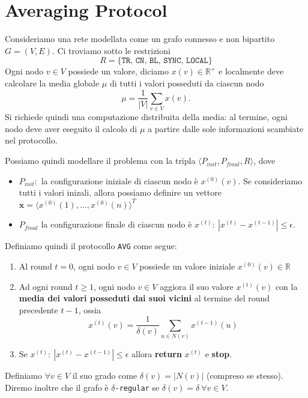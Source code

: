 \chapter{Averaging Protocol}

Consideriamo una rete modellata come un grafo connesso e non bipartito $G = (V, E)$. Ci troviamo sotto le restrizioni 
\[
    R = \{\texttt{TR, CN, BL, SYNC, LOCAL}\} 
\]
Ogni nodo $v \in V$ possiede un valore, diciamo $x(v) \in \mathbb{R}^+$ e localmente deve calcolare la media globale $\mu$ di tutti i valori posseduti da ciascun nodo
\[
    \mu=\frac{1}{|V|}\sum_{v\in V} x(v).
\]
Si richiede quindi una computazione distribuita della media: al termine, ogni nodo deve aver eseguito il calcolo di \(\mu\) a partire dalle sole informazioni scambiate nel protocollo.

Possiamo quindi modellare il problema con la tripla $\langle P_{init}, P_{final}, R\rangle$, dove

\begin{itemize}
    \item $P_{init}:$ la configurazione iniziale di ciascun nodo è $x^{(0)}(v)$. Se consideriamo tutti i valori inizali, allora possiamo definire un vettore $\mathbf{x} = \langle x^{(0)}(1), \dots, x^{(0)}(n)\rangle^T$
    \item $P_{final}$ la configurazione finale di ciascun nodo è $x^{(t)}:\ |x^{(t)} - x^{(t-1)}| \leq \epsilon$.
\end{itemize}

Definiamo quindi il protocollo \texttt{AVG} come segue:
\begin{enumerate}
    \item Al round $t = 0$, ogni nodo $v \in V$ possiede un valore iniziale $x^{(0)}(v) \in \mathbb{R}$
    \item Ad ogni round $t \geq 1$, ogni nodo $v \in V$ aggiora il suo valore $x^{(t)}(v)$ con la \textbf{media dei valori posseduti dai suoi vicini} al termine del round precedente $t - 1$, ossia
    \[
        x^{(t)}(v) = \frac{1}{\delta(v)} \sum_{u \in N(v)} x^{(t-1)}(u)
    \]
    \item Se $x^{(t)}:\ |x^{(t)} - x^{(t-1)}| \leq \epsilon$ allora \textbf{return} $x^{(t)}$ e \textbf{stop}.
\end{enumerate}

Definiamo $\forall v \in V$ il suo grado come $\delta(v) = |N(v)|$ (compreso se stesso). Diremo inoltre che il grafo è $\delta$\texttt{-regular} se $\delta(v) = \delta\ \forall v \in V$.

